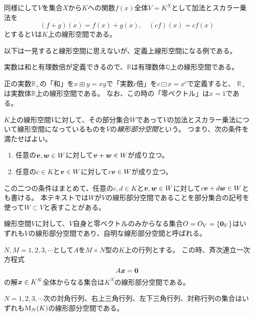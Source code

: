 \begin{example}[関数空間]
同様にして$V$を集合$X$から$K$への関数$f(x)$全体$V = K^X$として加法とスカラー乗法を
$$
(f+g)(x) = f(x)+g(x),
\quad (c f)(x) = c f(x)
$$
とすると$V$は$K$上の線形空間である。
\end{example}

以下は一見すると線形空間に思えないが、定義上線形空間になる例である。

\begin{example}
実数は和と有理数倍が定義できるので、$\mathbb{R}$は有理数体$\mathbb{Q}$上の線形空間である。
\end{example}

\begin{example}
正の実数$\mathbb{R}_+$の「和」を$x\boxplus y = x y$で「実数$c$倍」を$c\boxdot x = x^c$で定義すると、
$\mathbb{R}_+$は実数体$\mathbb{R}$上の線形空間である。
なお、この時の「零ベクトル」は$x = 1$である。
\end{example}

\begin{definition}[線形部分空間]
$K$上の線形空間$V$に対して、その部分集合$W$であって$V$の加法とスカラー乗法について線形空間になっているものを$V$の\emph{線形部分空間}という。
つまり、次の条件を満たせばよい。
\begin{enumerate}
\item
任意の$\vb*{v}, \vb*{w} \in W$に対して$\vb*{v}+\vb*{w} \in W$が成り立つ。
\item
任意の$c \in K$と$\vb*{v} \in W$に対して$c\vb*{v} \in W$が成り立つ。
\end{enumerate}
この二つの条件はまとめて、任意の$c, d \in K$と$\vb*{v}, \vb*{w} \in W$に対して$c\vb*{v}+d\vb*{w} \in W$とも書ける。
本テキストでは$W$が$V$の線形部分空間であることを部分集合の記号を使って$W \subset V$と表すことがある。
\end{definition}

線形空間$V$に対して、$V$自身と零ベクトルのみからなる集合$O = O_V = \{ \vb*{0}_V \}$はいずれも$V$の線形部分空間であり、自明な線形部分空間と呼ばれる。

\begin{example}[連立一次方程式の解空間]
$N, M = 1, 2, 3, \cdots$として$A$を$M\times N$型の$K$上の行列とする。
この時、斉次連立一次方程式
$$
A\vb*{x} = \vb*{0}
$$
の解$\vb*{x} \in K^N$全体からなる集合は$K^N$の線形部分空間である。
\end{example}

\begin{example}[行列空間の部分空間]
$N = 1, 2, 3, \cdots$次の対角行列、右上三角行列、左下三角行列、対称行列の集合はいずれも$\mathrm{M}_N(K)$の線形部分空間である。
\end{example}

